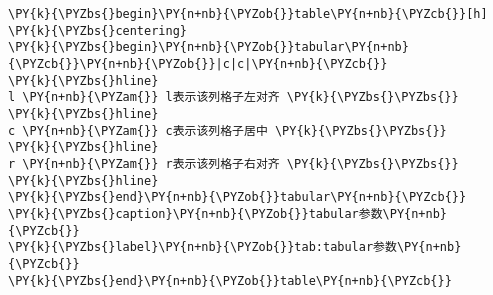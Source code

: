 \begin{Verbatim}[commandchars=\\\{\}]
\PY{k}{\PYZbs{}begin}\PY{n+nb}{\PYZob{}}table\PY{n+nb}{\PYZcb{}}[h]
\PY{k}{\PYZbs{}centering}
\PY{k}{\PYZbs{}begin}\PY{n+nb}{\PYZob{}}tabular\PY{n+nb}{\PYZcb{}}\PY{n+nb}{\PYZob{}}|c|c|\PY{n+nb}{\PYZcb{}}
\PY{k}{\PYZbs{}hline}
l \PY{n+nb}{\PYZam{}} l表示该列格子左对齐 \PY{k}{\PYZbs{}\PYZbs{}}
\PY{k}{\PYZbs{}hline}
c \PY{n+nb}{\PYZam{}} c表示该列格子居中 \PY{k}{\PYZbs{}\PYZbs{}}
\PY{k}{\PYZbs{}hline}
r \PY{n+nb}{\PYZam{}} r表示该列格子右对齐 \PY{k}{\PYZbs{}\PYZbs{}}
\PY{k}{\PYZbs{}hline}
\PY{k}{\PYZbs{}end}\PY{n+nb}{\PYZob{}}tabular\PY{n+nb}{\PYZcb{}}
\PY{k}{\PYZbs{}caption}\PY{n+nb}{\PYZob{}}tabular参数\PY{n+nb}{\PYZcb{}}
\PY{k}{\PYZbs{}label}\PY{n+nb}{\PYZob{}}tab:tabular参数\PY{n+nb}{\PYZcb{}}
\PY{k}{\PYZbs{}end}\PY{n+nb}{\PYZob{}}table\PY{n+nb}{\PYZcb{}}
\end{Verbatim}
